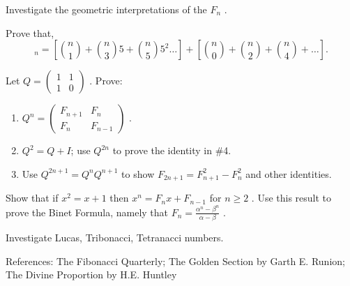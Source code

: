 \documentclass[10pt,]{book}
\theoremstyle{plain}
\theoremstyle{definition}
\theoremstyle{definition}
\theoremstyle{definition}
\theoremstyle{definition}
\numberwithin{equation}{chapter}
\newcommand{\amp}{&}
\begin{document}
\begin{divisionexercise}{5}\hypertarget{exercise-143}{}
\hypertarget{p-1303}{}%
Investigate the geometric interpretations of the \(F_{n}\) .%
\end{divisionexercise}%
\begin{divisionexercise}{6}\hypertarget{exercise-144}{}
\hypertarget{p-1304}{}%
Prove that,%
\begin{equation*}
_{n} = \left\lbrack \binom{n}{1}  + \binom{n}{3} 5 + \binom{n}{5} 5^{2}\ldots \right\rbrack + \left\lbrack \binom{n}{0}  + \binom{n}{2}  + \binom{n}{4}  + \ldots \right\rbrack.
\end{equation*}
%
\end{divisionexercise}%
\begin{divisionexercise}{7}\hypertarget{exercise-145}{}
\hypertarget{p-1305}{}%
Let \(Q =\begin{pmatrix}1 \amp 1 \\ 1 \amp 0\end{pmatrix}\) . Prove: \leavevmode%
\begin{enumerate}[label=(\alph*)]
\item\hypertarget{li-257}{}\hypertarget{p-1306}{}%
\(Q^{n} = \begin{pmatrix} F_{n + 1} \amp F_{n}\\ F_{n} \amp F_{n - 1} \end{pmatrix}\) .%
\item\hypertarget{li-258}{}\hypertarget{p-1307}{}%
\(Q^{2} = Q + I\); use \(Q^{2n}\) to prove the identity in \#4.%
\item\hypertarget{li-259}{}\hypertarget{p-1308}{}%
Use \(Q^{2n + 1} = Q^{n}Q^{n + 1}\) to show \(F_{2n + 1} = F_{n + 1}^{2} - F_{n}^{2}\) and other identities.%
\end{enumerate}
%
\end{divisionexercise}%
\begin{divisionexercise}{8}\hypertarget{exercise-146}{}
\hypertarget{p-1309}{}%
Show that if \(x^{2} = x + 1\) then \(x^{n} = F_{n}x + F_{n - 1}\) for \(n \geq 2\) . Use this result to prove the Binet Formula, namely that \(F_{n} = \frac{\alpha^{n} - \beta^{n}}{\alpha - \beta}\) .%
\end{divisionexercise}%
\begin{divisionexercise}{9}\hypertarget{exercise-147}{}
\hypertarget{p-1310}{}%
Investigate Lucas, Tribonacci, Tetranacci numbers.%
\end{divisionexercise}%
\bigbreak
\hypertarget{p-1311}{}%
References: The Fibonacci Quarterly; The Golden Section by Garth E. Runion; The Divine Proportion by H.E. Huntley%
\typeout{************************************************}
\typeout{************************************************}
\end{document}
